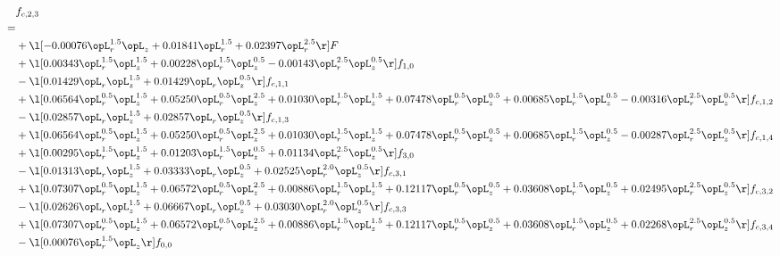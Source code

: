 \begin{alignat}{2} 
\label{eq:f_23_1} 
& f_{c,2,3} \nonumber \\ 
 = \\ 
& + \l[  -0.00076 \opL_r^{1.5} \opL_z +  0.01841 \opL_r^{1.5} +  0.02397 \opL_r^{2.5}  \r] F \nonumber \\ 
& + \l[  0.00343 \opL_r^{1.5} \opL_z^{1.5} +  0.00228 \opL_r^{1.5} \opL_z^{0.5}   -0.00143 \opL_r^{2.5} \opL_z^{0.5}  \r] f_{1,0} \nonumber \\ 
& - \l[  0.01429 \opL_r \opL_z^{1.5} +  0.01429 \opL_r \opL_z^{0.5}  \r] f_{c,1,1} \nonumber \\ 
& + \l[  0.06564 \opL_r^{0.5} \opL_z^{1.5} +  0.05250 \opL_r^{0.5} \opL_z^{2.5} +  0.01030 \opL_r^{1.5} \opL_z^{1.5} +  0.07478 \opL_r^{0.5} \opL_z^{0.5} +  0.00685 \opL_r^{1.5} \opL_z^{0.5}   -0.00316 \opL_r^{2.5} \opL_z^{0.5}  \r] f_{c,1,2} \nonumber \\ 
& - \l[  0.02857 \opL_r \opL_z^{1.5} +  0.02857 \opL_r \opL_z^{0.5}  \r] f_{c,1,3} \nonumber \\ 
& + \l[  0.06564 \opL_r^{0.5} \opL_z^{1.5} +  0.05250 \opL_r^{0.5} \opL_z^{2.5} +  0.01030 \opL_r^{1.5} \opL_z^{1.5} +  0.07478 \opL_r^{0.5} \opL_z^{0.5} +  0.00685 \opL_r^{1.5} \opL_z^{0.5}   -0.00287 \opL_r^{2.5} \opL_z^{0.5}  \r] f_{c,1,4} \nonumber \\ 
& + \l[  0.00295 \opL_r^{1.5} \opL_z^{1.5} +  0.01203 \opL_r^{1.5} \opL_z^{0.5} +  0.01134 \opL_r^{2.5} \opL_z^{0.5}  \r] f_{3,0} \nonumber \\ 
& - \l[  0.01313 \opL_r \opL_z^{1.5} +  0.03333 \opL_r \opL_z^{0.5} +  0.02525 \opL_r^{2.0} \opL_z^{0.5}  \r] f_{c,3,1} \nonumber \\ 
& + \l[  0.07307 \opL_r^{0.5} \opL_z^{1.5} +  0.06572 \opL_r^{0.5} \opL_z^{2.5} +  0.00886 \opL_r^{1.5} \opL_z^{1.5} +  0.12117 \opL_r^{0.5} \opL_z^{0.5} +  0.03608 \opL_r^{1.5} \opL_z^{0.5} +  0.02495 \opL_r^{2.5} \opL_z^{0.5}  \r] f_{c,3,2} \nonumber \\ 
& - \l[  0.02626 \opL_r \opL_z^{1.5} +  0.06667 \opL_r \opL_z^{0.5} +  0.03030 \opL_r^{2.0} \opL_z^{0.5}  \r] f_{c,3,3} \nonumber \\ 
& + \l[  0.07307 \opL_r^{0.5} \opL_z^{1.5} +  0.06572 \opL_r^{0.5} \opL_z^{2.5} +  0.00886 \opL_r^{1.5} \opL_z^{1.5} +  0.12117 \opL_r^{0.5} \opL_z^{0.5} +  0.03608 \opL_r^{1.5} \opL_z^{0.5} +  0.02268 \opL_r^{2.5} \opL_z^{0.5}  \r] f_{c,3,4} \nonumber \\ 
& - \l[  0.00076 \opL_r^{1.5} \opL_z  \r] f_{0,0} \nonumber \\ 

\end{alignat}
